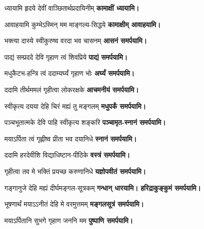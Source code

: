 \begin{center}

{ध्यायामि हृदये देवीं वाञ्छितार्थप्रदायिनीम्}
\textbf{कामाक्षीं ध्यायामि।}
\medskip

{आवाहयामि कुम्भेऽस्मिन् मम माङ्गल्य-सिद्धये}
\textbf{कामाक्षीम् आवाहयामि।}
\medskip

{भक्त्या दास्ये स्वीकुरुष्व वरदा भव चासनम्}
\textbf{\devAya{} आसनं समर्पयामि।}
\medskip

{पाद्यं सम्प्रददे देवि गृहाण त्वं शिवप्रिये}
\textbf{\devAya{} पाद्यं समर्पयामि।}
\medskip

{मधुकैटभ-हन्त्रि त्वं ददाम्यर्घ्यं गृहाण भोः}
\textbf{\devAya{} अर्घ्यं समर्पयामि।}
\medskip

{ददामि तीर्थममलं गृहीत्वा लोकरक्षके}
\textbf{\devAya{} आचमनीयं समर्पयामि।}
\medskip

{स्वीकृत्य दयया देहि चिरं मह्यं तु मङ्गलम्}
\textbf{\devAya{} मधुपर्कं समर्पयामि।}
\medskip

{पञ्चभूतात्मके देवि पाहि स्वीकृत्य शङ्करि}
\textbf{\devAya{} पञ्चामृत-स्नानं समर्पयामि।}
\medskip

{मयाऽर्पिता त्वं गृह्णीष्व प्रीता भव दयानिधे}
\textbf{\devAya{} स्नानं समर्पयामि।}
\medskip

{ददामि हरदेवीशि विद्याधिष्टान-पीठिके}
\textbf{\devAya{} वस्त्रं समर्पयामि।}
\medskip

{गृहीत्वा तव मे भक्तिं प्रयच्छ करुणानिधे}
\textbf{\devAya{} यज्ञोपवीतं समर्पयामि।}
\medskip

{गङ्गानुजे देहि मह्यं दीर्घमङ्गल-सूत्रकम्}
\textbf{\devAya{} गन्धान् धारयामि। हरिद्राकुङ्कुमं समर्पयामि।}
\medskip

{भूषणार्थं मयाऽऽनीतं देहि मे वरमुत्तमम्}
\textbf{\devAya{} मङ्गलसूत्रं समर्पयामि।}
\medskip

{मयाऽर्पितानि सुभगे गृहाण जननि मम}
\textbf{\devAya{} पुष्पाणि समर्पयामि।}
\medskip

\end{center}

